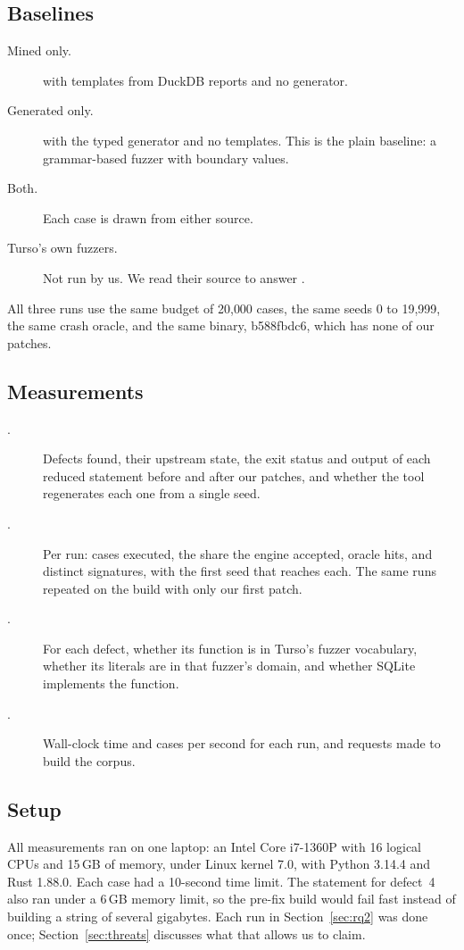 \subsection{Baselines}
\label{sec:baselines}
\begin{description}
  \item[Mined only.] \tool with templates from DuckDB reports and no generator.
  \item[Generated only.] \tool with the typed generator and no templates. This is
        the plain baseline: a grammar-based fuzzer with boundary values.
  \item[Both.] Each case is drawn from either source.
  \item[Turso's own fuzzers.] Not run by us. We read their source to answer
        .
\end{description}
All three runs use the same budget of 20{,}000 cases, the same seeds 0 to
19{,}999, the same crash oracle, and the same binary, b588fbdc6, which has none
of our patches.

\subsection{Measurements}
\begin{description}
  \item[.] Defects found, their upstream state, the exit status and
        output of each reduced statement before and after our patches, and
        whether the tool regenerates each one from a single seed.
  \item[.] Per run: cases executed, the share the engine accepted, oracle
        hits, and distinct signatures, with the first seed that reaches each.
        The same runs repeated on the build with only our first patch.
  \item[.] For each defect, whether its function is in Turso's fuzzer
        vocabulary, whether its literals are in that fuzzer's domain, and whether
        SQLite implements the function.
  \item[.] Wall-clock time and cases per second for each run, and
        requests made to build the corpus.
\end{description}

\subsection{Setup}
All measurements ran on one laptop: an Intel Core i7-1360P with 16 logical CPUs
and 15\,GB of memory, under Linux kernel 7.0, with Python 3.14.4 and Rust
1.88.0. Each case had a 10-second time limit. The statement for defect~4 also ran
under a 6\,GB memory limit, so the pre-fix build would fail fast instead of
building a string of several gigabytes. Each run in Section~\ref{sec:rq2} was
done once; Section~\ref{sec:threats} discusses what that allows us to claim.

